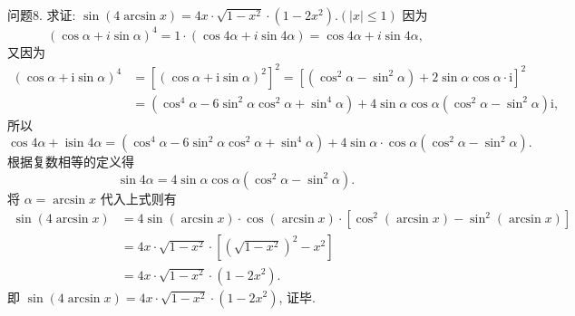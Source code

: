 问题8. 求证: $\sin (4 \arcsin x)=4 x \cdot \sqrt{1-x^2} \cdot\left(1-2 x^2\right) .(|x| \leqslant 1)$
因为
$$
(\cos \alpha+i \sin \alpha)^4=1 \cdot(\cos 4 \alpha+i \sin 4 \alpha)=\cos 4 \alpha+i \sin 4 \alpha,
$$
又因为
$$
\begin{aligned}
(\cos \alpha+\mathrm{i} \sin \alpha)^4 & =\left[(\cos \alpha+\mathrm{i} \sin \alpha)^2\right]^2=\left[\left(\cos ^2 \alpha-\sin ^2 \alpha\right)+2 \sin \alpha \cos \alpha \cdot \mathrm{i}\right]^2 \\
& =\left(\cos ^4 \alpha-6 \sin ^2 \alpha \cos ^2 \alpha+\sin ^4 \alpha\right)+4 \sin \alpha \cos \alpha\left(\cos ^2 \alpha-\sin ^2 \alpha\right) \mathrm{i},
\end{aligned}
$$
所以
$$
\cos 4 \alpha+\operatorname{isin} 4 \alpha=\left(\cos ^4 \alpha-6 \sin ^2 \alpha \cos ^2 \alpha+\sin ^4 \alpha\right)+4 \sin \alpha \cdot \cos \alpha\left(\cos ^2 \alpha-\sin ^2 \alpha\right) \text {. }
$$
根据复数相等的定义得
$$
\sin 4 \alpha=4 \sin \alpha \cos \alpha\left(\cos ^2 \alpha-\sin ^2 \alpha\right) .
$$
将 $\alpha=\arcsin x$ 代入上式则有
$$
\begin{aligned}
\sin (4 \arcsin x) & =4 \sin (\arcsin x) \cdot \cos (\arcsin x) \cdot\left[\cos ^2(\arcsin x)-\sin ^2(\arcsin x)\right] \\
& =4 x \cdot \sqrt{1-x^2} \cdot\left[\left(\sqrt{1-x^2}\right)^2-x^2\right] \\
& =4 x \cdot \sqrt{1-x^2} \cdot\left(1-2 x^2\right) .
\end{aligned}
$$
即 $\sin (4 \arcsin x)=4 x \cdot \sqrt{1-x^2} \cdot\left(1-2 x^2\right)$, 证毕.


